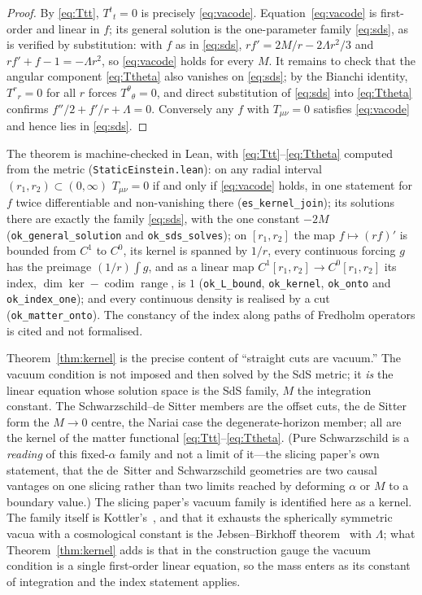 \documentclass[11pt,a4paper]{article}
\theoremstyle{definition}
\newcommand{\Tud}[2]{T^{#1}{}_{#2}}
\begin{document}
\begin{proof}
By \eqref{eq:Ttt}, $\Tud{t}{t}=0$ is precisely \eqref{eq:vacode}. Equation~\eqref{eq:vacode} is first-order and linear in $f$; its general solution is the one-parameter family \eqref{eq:sds}, as is verified by substitution: with $f$ as in \eqref{eq:sds}, $rf'=2M/r-2\Lambda r^{2}/3$ and $rf'+f-1=-\Lambda r^{2}$, so \eqref{eq:vacode} holds for every $M$. It remains to check that the angular component \eqref{eq:Ttheta} also vanishes on \eqref{eq:sds}; by the Bianchi identity, $\Tud{r}{r}=0$ for all $r$ forces $\Tud{\theta}{\theta}=0$, and direct substitution of \eqref{eq:sds} into \eqref{eq:Ttheta} confirms $f''/2+f'/r+\Lambda=0$. Conversely any $f$ with $T_{\mu\nu}=0$ satisfies \eqref{eq:vacode} and hence lies in \eqref{eq:sds}.
\end{proof}

The theorem is machine-checked in Lean, with \eqref{eq:Ttt}--\eqref{eq:Ttheta} computed from the metric (\texttt{StaticEinstein.lean}): on any radial interval $(r_{1},r_{2})\subset(0,\infty)$ $T_{\mu\nu}=0$ if and only if \eqref{eq:vacode} holds, in one statement for $f$ twice differentiable and non-vanishing there (\texttt{es\_kernel\_join}); its solutions there are exactly the family \eqref{eq:sds}, with the one constant $-2M$ (\texttt{ok\_general\_solution} and \texttt{ok\_sds\_solves}); on $[r_{1},r_{2}]$ the map $f\mapsto(rf)'$ is bounded from $C^{1}$ to $C^{0}$, its kernel is spanned by $1/r$, every continuous forcing $g$ has the preimage $(1/r)\int g$, and as a linear map $C^{1}[r_{1},r_{2}]\to C^{0}[r_{1},r_{2}]$ its index, $\dim\ker-\operatorname{codim}\operatorname{range}$, is $1$ (\texttt{ok\_L\_bound}, \texttt{ok\_kernel}, \texttt{ok\_onto} and \texttt{ok\_index\_one}); and every continuous density is realised by a cut (\texttt{ok\_matter\_onto}). The constancy of the index along paths of Fredholm operators is cited and not formalised.

Theorem~\ref{thm:kernel} is the precise content of ``straight cuts are vacuum.'' The vacuum condition is not imposed and then solved by the SdS metric; it \emph{is} the linear equation whose solution space is the SdS family, $M$ the integration constant. The Schwarzschild--de Sitter members are the offset cuts, the de Sitter form the $M\to0$ centre, the Nariai case the degenerate-horizon member; all are the kernel of the matter functional \eqref{eq:Ttt}--\eqref{eq:Ttheta}. (Pure Schwarzschild is a \emph{reading} of this fixed-$\alpha$ family and not a limit of it---the slicing paper's own statement, that the de~Sitter and Schwarzschild geometries are two causal vantages on one slicing rather than two limits reached by deforming $\alpha$ or $M$ to a boundary value.) The slicing paper's vacuum family is identified here as a kernel. The family itself is Kottler's~\cite{Kottler1918}, and that it exhausts the spherically symmetric vacua with a cosmological constant is the Jebsen--Birkhoff theorem~\cite{Jebsen1921,Birkhoff1923} with $\Lambda$; what Theorem~\ref{thm:kernel} adds is that in the construction gauge the vacuum condition is a single first-order linear equation, so the mass enters as its constant of integration and the index statement applies.
\end{document}
